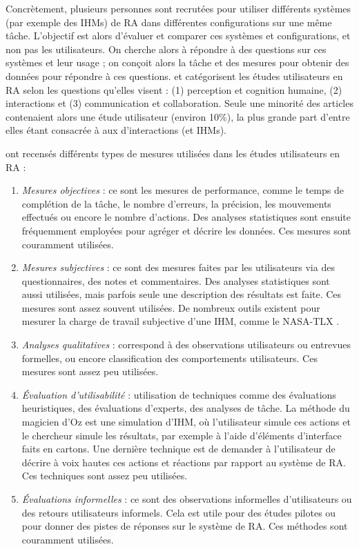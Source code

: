 Concrètement, plusieurs personnes sont recrutées pour utiliser différents systèmes (par exemple des IHMs) de RA dans différentes configurations sur une même tâche. L'objectif est alors d'évaluer et comparer ces systèmes et configurations, et non pas les utilisateurs. On cherche alors à répondre à des questions sur ces systèmes et leur usage ; on conçoit alors la tâche et des mesures pour obtenir des données pour répondre à ces questions. \cite{Swan2005} et \cite{Duenser2008} catégorisent les études utilisateurs en RA selon les questions qu'elles visent : (1) perception et cognition humaine, (2) interactions et (3) communication et collaboration. Seule une minorité des articles contenaient alors une étude utilisateur (environ 10\%), la plus grande part d'entre elles étant consacrée à aux d'interactions (et IHMs).

\cite{Duenser2008} ont recensés différents types de mesures utilisées dans les études utilisateurs en RA :
\begin{enumerate}
  \item \emph{Mesures objectives} : ce sont les mesures de performance, comme le temps de complétion de la tâche, le nombre d'erreurs, la précision, les mouvements effectués ou encore le nombre d'actions. Des analyses statistiques sont ensuite fréquemment employées pour agréger et décrire les données. Ces mesures sont couramment utilisées.
  \item \emph{Mesures subjectives} : ce sont des mesures faites par les utilisateurs via des questionnaires, des notes et commentaires. Des analyses statistiques sont aussi utilisées, mais parfois seule une description des résultats est faite. Ces mesures sont assez souvent utilisées. De nombreux outils existent pour mesurer la charge de travail subjective d'une IHM, comme le NASA-TLX \citep{Rubio2004}.
  \item \emph{Analyses qualitatives} : correspond à des observations utilisateurs ou entrevues formelles, ou encore classification des comportements utilisateurs. Ces mesures sont assez peu utilisées.
  \item \emph{Évaluation d'utilisabilité} : utilisation de techniques comme des évaluations heuristiques, des évaluations d'experts, des analyses de tâche. La méthode du magicien d'Oz est une simulation d'IHM, où l'utilisateur simule ces actions et le chercheur simule les résultats, par exemple à l'aide d'éléments d'interface faits en cartons. Une dernière technique est de demander à l'utilisateur de décrire à voix hautes ces actions et réactions par rapport au système de RA. Ces techniques sont assez peu utilisées.
  \item \emph{Évaluations informelles} : ce sont des observations informelles d'utilisateurs ou des retours utilisateurs informels. Cela est utile pour des études pilotes ou pour donner des pistes de réponses sur le système de RA. Ces méthodes sont couramment utilisées.
\end{enumerate}


